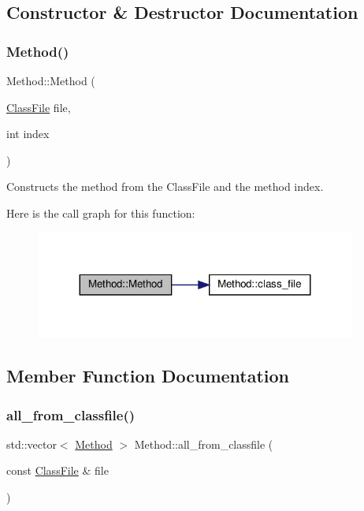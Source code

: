 \subsection{Constructor \& Destructor Documentation}
\mbox{\label{classMethod_aba8db898e71ab542920887eba94e6234}} 
\subsubsection{\texorpdfstring{Method()}{Method()}}
{\footnotesize\ttfamily Method\+::\+Method (\begin{DoxyParamCaption}\item[{\hyperlink{classfile_8h_a00b46b60bc40e813e9fb1bb049174346}{Class\+File}}]{file,  }\item[{int}]{index }\end{DoxyParamCaption})\hspace{0.3cm}{\ttfamily [private]}}



Constructs the method from the Class\+File and the method index. 

Here is the call graph for this function\+:
\nopagebreak
\begin{figure}[H]
\begin{center}
\leavevmode
\includegraphics[width=299pt]{classMethod_aba8db898e71ab542920887eba94e6234_cgraph}
\end{center}
\end{figure}


\subsection{Member Function Documentation}
\mbox{\label{classMethod_a7b631e75e7438bb79c285b1bc6a712ab}} 
\subsubsection{\texorpdfstring{all\+\_\+from\+\_\+classfile()}{all\_from\_classfile()}}
{\footnotesize\ttfamily std\+::vector$<$ \hyperlink{classMethod}{Method} $>$ Method\+::all\+\_\+from\+\_\+classfile (\begin{DoxyParamCaption}\item[{const \hyperlink{classfile_8h_a00b46b60bc40e813e9fb1bb049174346}{Class\+File} \&}]{file }\end{DoxyParamCaption})\hspace{0.3cm}{\ttfamily [static]}}



